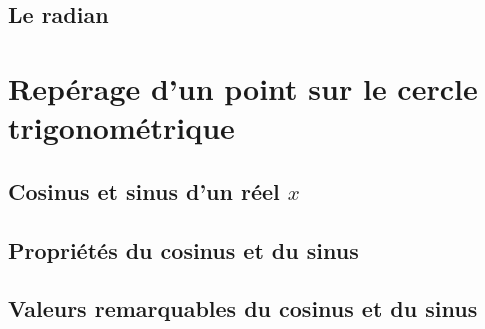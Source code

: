 \documentclass[10pt]{beamer}
\theoremstyle{definition}
\theoremstyle{example}
\begin{document}
\subsection{Le radian}

\begin{frame}

\end{frame}

\section{Repérage d'un point sur le cercle trigonométrique}
\subsection{Cosinus et sinus d'un réel $x$}

\begin{frame}

\end{frame}

\subsection{Propriétés du cosinus et du sinus}

\begin{frame}

\end{frame}

\subsection{Valeurs remarquables du cosinus et du sinus}

\begin{frame}

\end{frame}
\end{document}
